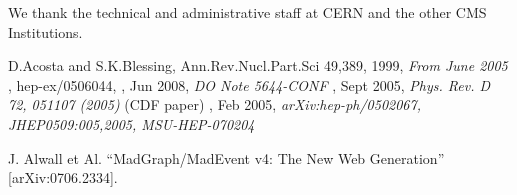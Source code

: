 \documentclass{cmspaper}
\begin{document}
\begin{linenumbers}
We thank the technical and administrative staff at CERN and the other CMS Institutions.



\begin{thebibliography}{}

 {D.Acosta and S.K.Blessing, Ann.Rev.Nucl.Part.Sci 49,389},
  1999,
  {\em From June 2005}
, hep-ex/0506044,
, Jun 2008,
  {\em DO Note 5644-CONF}
, Sept 2005,
  {\em Phys. Rev. D 72, 051107 (2005)} (CDF paper)
, Feb 2005,
  {\em arXiv:hep-ph/0502067, JHEP0509:005,2005, MSU-HEP-070204}
  
  
  J. Alwall et Al.
  ``MadGraph/MadEvent v4: The New Web Generation''
  [arXiv:0706.2334].
  
  

\end{thebibliography}
\end{linenumbers}
\end{document}
